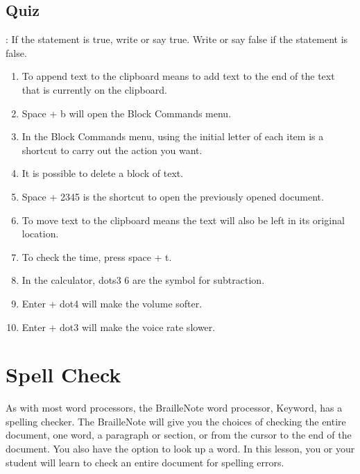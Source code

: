 \documentclass[10pt,letterpaper,twoside]{report}
\begin{document}
{\subsection{Quiz}:
If the statement is true, write or say true. Write or say false if the statement is false.
\begin{enumerate}
	\item To append text to the clipboard means to add text to the end of the text that is currently on the clipboard.
	\item Space + b will open the Block Commands menu.
	\item In the Block Commands menu, using the initial letter of each item is a shortcut to carry out the action you want.
	\item It is possible to delete a block of text.
	\item Space + 2345 is the shortcut to open the previously opened document.
	\item To move text to the clipboard means the text will also be left in its original location.
	\item To check the time, press space + t.
	\item In the calculator, dots3 6 are the symbol for subtraction.
	\item Enter + dot4 will make the volume softer.
	\item Enter + dot3 will make the voice rate slower.
\end{enumerate}

\clearpage
\section{Spell Check}
As with most word processors, the BrailleNote word processor, Keyword, has a spelling checker. The BrailleNote will give you the choices of checking the entire document, one word, a paragraph or section, or from the cursor to the end of the document. You also have the option to look up a word. In this lesson, you or your student will learn to check an entire document for spelling errors.
}
\end{document}
